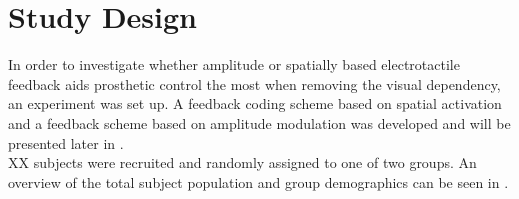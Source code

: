 \section{Study Design}

In order to investigate whether amplitude or spatially based electrotactile feedback aids prosthetic control the most when removing the visual dependency, an experiment was set up. A feedback coding scheme based on spatial activation and a feedback scheme based on amplitude modulation was developed and will be presented later in . \\
XX subjects were recruited and randomly assigned to one of two groups. An overview of the total subject population and group demographics can be seen in . 

